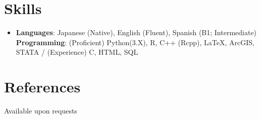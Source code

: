 \documentclass[letterpaper,11pt]{article} %
\begin{document}
\begin{comment}
This section is compressed from the various skills sections that Euro CV
recommends.
\end{comment}

\section{Skills}
\begin{itemize}[leftmargin=0.5cm, label={}]
    \item{
     \textbf{Languages}{: Japanese (Native), English (Fluent), Spanish (B1; Intermediate)} \\
     \textbf{Programming}{: (Proficient) Python(3.X), R, C++ (Rcpp), \LaTeX, ArcGIS, STATA / (Experience) C, HTML, SQL}
    }
\end{itemize}

\section{References}
Available upon requests

\end{document}
